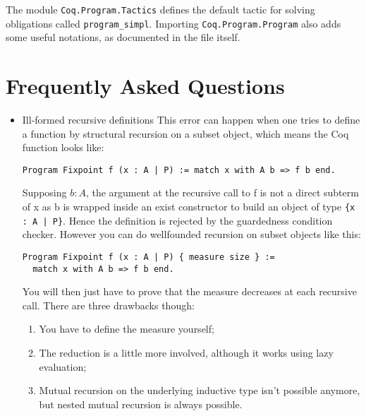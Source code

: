 The module {\tt Coq.Program.Tactics} defines the default tactic for solving
obligations called {\tt program\_simpl}. Importing 
{\tt Coq.Program.Program} also adds some useful notations, as documented in the file itself.

\section{Frequently Asked Questions
  \label{ProgramFAQ}}

\begin{itemize}
\item {Ill-formed recursive definitions}
  This error can happen when one tries to define a
  function by structural recursion on a subset object, which means the Coq
  function looks like:
  
  \verb$Program Fixpoint f (x : A | P) := match x with A b => f b end.$
  
  Supposing $b : A$, the argument at the recursive call to f is not a
  direct subterm of x as b is wrapped inside an exist constructor to build
  an object of type \verb${x : A | P}$.  Hence the definition is rejected
  by the guardedness condition checker. However you can do
  wellfounded recursion on subset objects like this:
  
\begin{verbatim}
Program Fixpoint f (x : A | P) { measure size } :=
  match x with A b => f b end.
\end{verbatim}
  
  You will then just have to prove that the measure decreases at each recursive
  call. There are three drawbacks though: 
  \begin{enumerate}
  \item You have to define the measure yourself;
  \item The reduction is a little more involved, although it works
    using lazy evaluation;
  \item Mutual recursion on the underlying inductive type isn't possible
    anymore, but nested mutual recursion is always possible.
  \end{enumerate}
\end{itemize}


